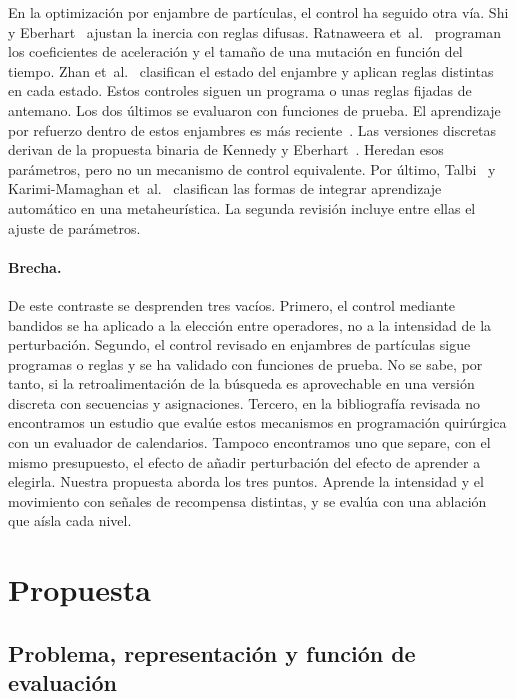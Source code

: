 \documentclass[10pt,a4paper]{article}
\begin{document}
En la optimización por enjambre de partículas, el control ha seguido otra vía. Shi y
Eberhart~\cite{shi2001} ajustan la inercia con reglas difusas. Ratnaweera
et~al.~\cite{ratnaweera2004} programan los coeficientes de aceleración y el tamaño de una
mutación en función del tiempo. Zhan et~al.~\cite{zhan2009} clasifican el estado del enjambre
y aplican reglas distintas en cada estado. Estos controles siguen un programa o unas
reglas fijadas de antemano. Los dos últimos se evaluaron con funciones de prueba. El aprendizaje por refuerzo dentro
de estos enjambres es más reciente~\cite{samma2016}. Las versiones discretas derivan de la
propuesta binaria de Kennedy y Eberhart~\cite{kennedy1997}. Heredan esos parámetros, pero no
un mecanismo de control equivalente. Por último, Talbi~\cite{talbi2021} y Karimi-Mamaghan et~al.~\cite{karimi2022} clasifican las
formas de integrar aprendizaje automático en una metaheurística. La segunda revisión incluye
entre ellas el ajuste de parámetros.

\paragraph{Brecha.}
De este contraste se desprenden tres vacíos. Primero, el control mediante bandidos se ha
aplicado a la elección entre operadores, no a la intensidad de la perturbación. Segundo, el
control revisado en enjambres de partículas sigue programas o reglas y se ha validado con
funciones de prueba. No se sabe, por tanto, si la
retroalimentación de la búsqueda es aprovechable en una versión discreta con secuencias y
asignaciones. Tercero, en la bibliografía revisada no encontramos un estudio que evalúe estos
mecanismos en programación quirúrgica con un evaluador de calendarios. Tampoco encontramos uno
que separe, con el mismo presupuesto, el efecto de añadir perturbación del efecto de aprender a
elegirla. Nuestra propuesta aborda los tres puntos. Aprende la intensidad y el movimiento con
señales de recompensa distintas, y se evalúa con una ablación que aísla cada nivel.

\section{Propuesta}

\subsection{Problema, representación y función de evaluación}
\label{sec:prob}
\end{document}

